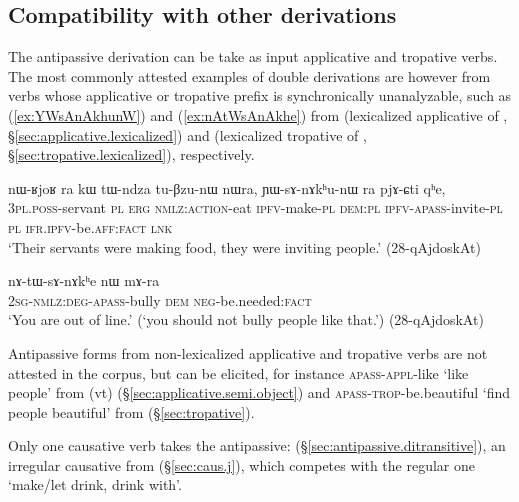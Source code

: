  \subsection{Compatibility with other derivations} \label{sec:antipassive.compatibility}
 The  antipassive derivation can be take as input applicative and tropative verbs. The most commonly attested examples of double derivations are however from verbs whose applicative or tropative prefix is synchronically unanalyzable, such as    (\ref{ex:YWsAnAkhunW}) and   (\ref{ex:nAtWsAnAkhe}) from   (lexicalized applicative of , §\ref{sec:applicative.lexicalized}) and  (lexicalized  tropative of , §\ref{sec:tropative.lexicalized}), respectively.
 \largerpage
\begin{exe}
\ex \label{ex:YWsAnAkhunW}
\gll  nɯ-ʁjoʁ ra kɯ tɯ-ndza tu-βzu-nɯ nɯra, ɲɯ-sɤ-nɤkʰu-nɯ ra pjɤ-ɕti qʰe,  \\
\textsc{3pl}.\textsc{poss}-servant \textsc{pl} \textsc{erg} \textsc{nmlz}:\textsc{action}-eat \textsc{ipfv}-make-\textsc{pl} \textsc{dem}:\textsc{pl} \textsc{ipfv}-\textsc{apass}-invite-\textsc{pl} \textsc{pl} \textsc{ifr}.\textsc{ipfv}-be.\textsc{aff}:\textsc{fact} \textsc{lnk} \\
\glt `Their servants were making food, they were inviting people.' (28-qAjdoskAt) 	
  \end{exe}
  
 \begin{exe}
\ex \label{ex:nAtWsAnAkhe}
\gll  nɤ-tɯ-sɤ-nɤkʰe nɯ mɤ-ra \\
\textsc{2sg}-\textsc{nmlz}:\textsc{deg}-\textsc{apass}-bully \textsc{dem} \textsc{neg}-be.needed:\textsc{fact} \\
\glt `You are out of line.' (`you should not bully people like that.') (28-qAjdoskAt) 
 \end{exe}
 
Antipassive forms from non-lexicalized applicative and tropative verbs are not attested in the corpus, but can be elicited, for instance  \textsc{apass}-\textsc{appl}-like `like people' from   (vt) (§\ref{sec:applicative.semi.object}) and  \textsc{apass}-\textsc{trop}-be.beautiful `find people beautiful' from   (§\ref{sec:tropative}).

Only one causative verb takes the  antipassive:   (§\ref{sec:antipassive.ditransitive}), an irregular causative from  (§\ref{sec:caus.j}), which competes with the regular one  `make/let drink, drink with'.


